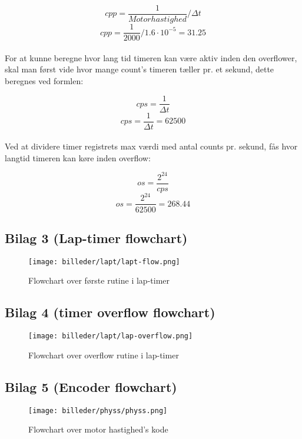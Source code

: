 \documentclass[11pt]{article}
\begin{document}
$$cpp = \frac{1}{Motor hastighed} / \Delta t$$
$$cpp = \frac{1}{2000} / 1.6 \cdot 10^{-5} = 31.25$$\\

For at kunne beregne hvor lang tid timeren kan være aktiv inden den overflower, skal man først vide hvor mange count's timeren tæller pr. et sekund, dette  beregnes ved formlen:

$$cps = \frac{1}{\Delta t}$$
$$cps = \frac{1}{\Delta t} = 62500$$\\

\pagebreak
Ved at dividere timer registrets max værdi med antal counts pr. sekund, fås hvor langtid timeren kan køre inden overflow:

$$os = \frac{2^{24}}{cps}$$
$$os = \frac{2^{24}}{62500} = 268.44$$


\newpage
\subsection{Bilag 3 (Lap-timer flowchart)}

\begin{figure}[h]
\centering
\texttt{[image: billeder/lapt/lapt-flow.png]}
\caption{Flowchart over første rutine i lap-timer}
\label{fig:lapt-flow}
\end{figure}


\newpage
\subsection{Bilag 4 (timer overflow flowchart)}

\begin{figure}[h]
\centering
\texttt{[image: billeder/lapt/lap-overflow.png]}
\caption{Flowchart over overflow rutine i lap-timer}
\label{fig:lap-overflow}
\end{figure}

\newpage
\subsection{Bilag 5 (Encoder flowchart)}

\begin{figure}[ht]
\centering
\texttt{[image: billeder/physs/physs.png]}
\caption{Flowchart over motor hastighed's kode}
\label{fig:physs}
\end{figure}
\end{document}
